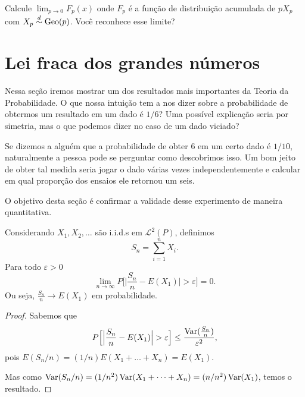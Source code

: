 \begin{exercise}
  Calcule $\lim_{p \to 0} F_p(x)$ onde $F_p$ é a função de distribuição acumulada de $p X_p$ com $X_p \overset{d}\sim \operatorname{Geo}(p)$.
  Você reconhece esse limite?
\end{exercise}

\section{Lei fraca dos grandes números}

Nessa seção iremos mostrar um dos resultados mais importantes da Teoria da Probabilidade.
O que nossa intuição tem a nos dizer sobre a probabilidade de obtermos um resultado em um dado é $1/6$?
Uma possível explicação seria por simetria, mas o que podemos dizer no caso de um dado viciado?

Se dizemos a alguém que a probabilidade de obter $6$ em um certo dado é $1/10$, naturalmente a pessoa pode se perguntar como descobrimos isso.
Um bom jeito de obter tal medida seria jogar o dado várias vezes independentemente e calcular em qual proporção dos ensaios ele retornou um seis.

O objetivo desta seção é confirmar a validade desse experimento de maneira quantitativa.

\begin{theorem}
  \label{t:lei_fraca}
  Considerando $X_1, X_2, \dots$ são i.i.d.s em $\mathcal{L}^2(P)$, definimos
  \begin{equation}
    S_n = \sum_{i=1}^n X_i.
  \end{equation}
  Para todo $\varepsilon > 0$
  \begin{equation}
    \lim_{n \to \infty} P \Big[\Big| \frac{S_n}{n} - E(X_1)\Big| > \varepsilon \Big] = 0.
  \end{equation}
  Ou seja, $\tfrac{S_n}{n} \to E(X_1)$ em probabilidade.
\end{theorem}

\begin{proof}
  Sabemos que
  \begin{equation}
    P \Big[\Big| \frac{S_n}{n} - E(X_1)\Big| > \varepsilon \Big] \leq \frac{\operatorname{Var}(\tfrac{S_n}{n})}{\varepsilon^2},
  \end{equation}
  pois $E(S_n/n) = (1/n) E(X_1 + \dots + X_n) = E(X_1)$.

  Mas como $\operatorname{Var}(S_n/n) = (1/n^2) \operatorname{Var} (X_1 + \dots + X_n) = (n/n^2) \operatorname{Var}(X_1)$, temos o resultado.
\end{proof}

